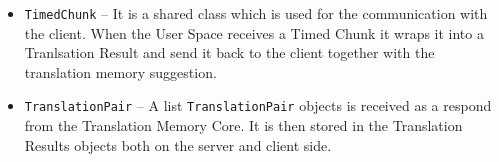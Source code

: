 \begin{itemize}
\item {\tt TimedChunk} -- It is a shared class which is used for the communication with the client. When the User Space receives a Timed Chunk it wraps it into a Tranlsation Result and send it back to the client together with the translation memory suggestion.

\item {\tt TranslationPair} -- A list {\tt TranslationPair} objects is received as a respond from the Translation Memory Core. It is then stored in the Translation Results objects both on the server and client side.
\end{itemize}
